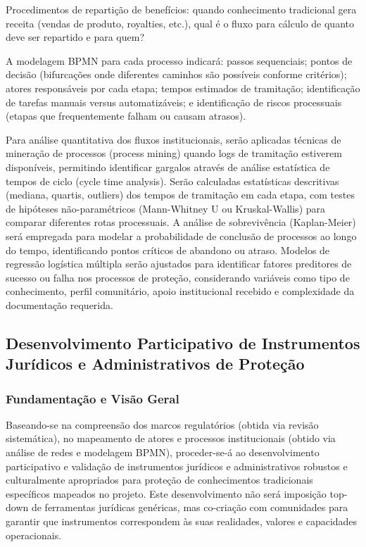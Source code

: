 Procedimentos de repartição de benefícios: quando conhecimento tradicional gera receita (vendas de produto, royalties, etc.), qual é o fluxo para cálculo de quanto deve ser repartido e para quem?

A modelagem BPMN para cada processo indicará: passos sequenciais; pontos de decisão (bifurcações onde diferentes caminhos são possíveis conforme critérios); atores responsáveis por cada etapa; tempos estimados de tramitação; identificação de tarefas manuais versus automatizáveis; e identificação de riscos processuais (etapas que frequentemente falham ou causam atrasos).

Para análise quantitativa dos fluxos institucionais, serão aplicadas técnicas de mineração de processos (process mining) quando logs de tramitação estiverem disponíveis, permitindo identificar gargalos através de análise estatística de tempos de ciclo (cycle time analysis). Serão calculadas estatísticas descritivas (mediana, quartis, outliers) dos tempos de tramitação em cada etapa, com testes de hipóteses não-paramétricos (Mann-Whitney U ou Kruskal-Wallis) para comparar diferentes rotas processuais. A análise de sobrevivência (Kaplan-Meier) será empregada para modelar a probabilidade de conclusão de processos ao longo do tempo, identificando pontos críticos de abandono ou atraso. Modelos de regressão logística múltipla serão ajustados para identificar fatores preditores de sucesso ou falha nos processos de proteção, considerando variáveis como tipo de conhecimento, perfil comunitário, apoio institucional recebido e complexidade da documentação requerida.



\subsection{Desenvolvimento Participativo de Instrumentos Jurídicos e Administrativos de Proteção}

\subsubsection{Fundamentação e Visão Geral}

Baseando-se na compreensão dos marcos regulatórios (obtida via revisão sistemática), no mapeamento de atores e processos institucionais (obtido via análise de redes e modelagem BPMN), proceder-se-á ao desenvolvimento participativo e validação de instrumentos jurídicos e administrativos robustos e culturalmente apropriados para proteção de conhecimentos tradicionais específicos mapeados no projeto. Este desenvolvimento não será imposição top-down de ferramentas jurídicas genéricas, mas co-criação com comunidades para garantir que instrumentos correspondem às suas realidades, valores e capacidades operacionais.

